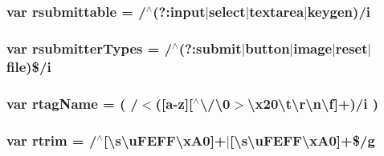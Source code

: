 \subsubsection[{\texorpdfstring{rsubmittable}{rsubmittable}}]{\setlength{\rightskip}{0pt plus 5cm}var rsubmittable = /$^\wedge$(?\+:{\bf input}$\vert$select$\vert$textarea$\vert$keygen)/i}\hypertarget{jquery-3_82_81_8js_a12d248d7e6c5985c5ea21f56fbef9e90}{}\label{jquery-3_82_81_8js_a12d248d7e6c5985c5ea21f56fbef9e90}
\subsubsection[{\texorpdfstring{rsubmitter\+Types}{rsubmitterTypes}}]{\setlength{\rightskip}{0pt plus 5cm}var rsubmitter\+Types = /$^\wedge$(?\+:{\bf submit}$\vert$button$\vert$image$\vert$reset$\vert$file)\$/i}\hypertarget{jquery-3_82_81_8js_a0e9cd4ca08945afe827846f34a36c74a}{}\label{jquery-3_82_81_8js_a0e9cd4ca08945afe827846f34a36c74a}
\subsubsection[{\texorpdfstring{rtag\+Name}{rtagName}}]{\setlength{\rightskip}{0pt plus 5cm}var rtag\+Name = ( /$<$(\mbox{[}a-\/z\mbox{]}\mbox{[}$^\wedge$\textbackslash{}/\textbackslash{}0$>$\textbackslash{}x20\textbackslash{}t\textbackslash{}r\textbackslash{}n\textbackslash{}f\mbox{]}+)/i )}\hypertarget{jquery-3_82_81_8js_a572bc9f0626d64ea72b4577c2427b2e2}{}\label{jquery-3_82_81_8js_a572bc9f0626d64ea72b4577c2427b2e2}
\subsubsection[{\texorpdfstring{rtrim}{rtrim}}]{\setlength{\rightskip}{0pt plus 5cm}var rtrim = /$^\wedge$\mbox{[}\textbackslash{}s\textbackslash{}u\+F\+E\+F\+F\textbackslash{}x\+A0\mbox{]}+$\vert$\mbox{[}\textbackslash{}s\textbackslash{}u\+F\+E\+F\+F\textbackslash{}x\+A0\mbox{]}+\$/g}\hypertarget{jquery-3_82_81_8js_a4a6734f7bc3f896785855b829a1d5d9e}{}\label{jquery-3_82_81_8js_a4a6734f7bc3f896785855b829a1d5d9e}
